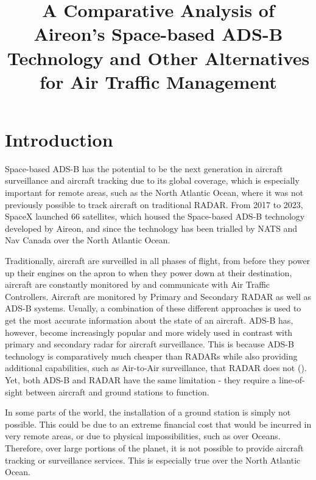 \documentclass[stu, a4paper, 12pt, floatsintext]{apa7}
\title{A Comparative Analysis of Aireon’s Space-based ADS-B Technology and Other Alternatives for Air Traffic Management}
\numberwithin{figure}{section}
\numberwithin{table}{section}
\numberwithin{equation}{section}
\begin{document}
\maketitle{} %

\tableofcontents
\newpage

\listoffigures
{}
\listoftables

\newpage
\section{Introduction}
Space-based ADS-B has the potential to be the next generation in aircraft surveillance and aircraft tracking due to its global coverage, which is especially important for remote areas, such as the North Atlantic Ocean, where it was not previously possible to track aircraft on traditional RADAR. From 2017 to 2023, SpaceX launched 66 satellites, which housed the Space-based ADS-B technology developed by Aireon, and since the technology has been trialled by NATS and Nav Canada over the North Atlantic Ocean. 

Traditionally, aircraft are surveilled in all phases of flight, from before they power up their engines on the apron to when they power down at their destination, aircraft are constantly monitored by and communicate with Air Traffic Controllers. Aircraft are monitored by Primary and Secondary RADAR as well as ADS-B systems. Usually, a combination of these different approaches is used to get the most accurate information about the state of an aircraft. ADS-B has, however, become increasingly popular and more widely used in contrast with primary and secondary radar for aircraft surveillance. This is because ADS-B technology is comparatively much cheaper than RADARs while also providing additional capabilities, such as Air-to-Air surveillance, that RADAR does not (\cite{AvionixTech}). Yet, both ADS-B and RADAR have the same limitation - they require a line-of-sight between aircraft and ground stations to function.

In some parts of the world, the installation of a ground station is simply not possible. This could be due to an extreme financial cost that would be incurred in very remote areas, or due to physical impossibilities, such as over Oceans. Therefore, over large portions of the planet, it is not possible to provide aircraft tracking or surveillance services. This is especially true over the North Atlantic Ocean.  
\end{document}

